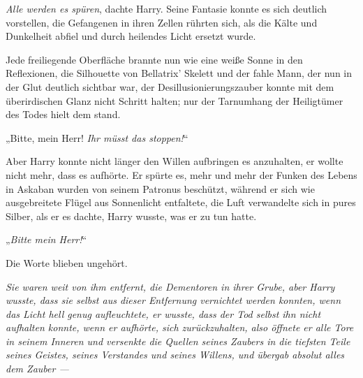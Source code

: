 \emph{Alle werden es spüren}, dachte Harry. Seine Fantasie konnte es sich deutlich vorstellen, die Gefangenen in ihren Zellen rührten sich, als die Kälte und Dunkelheit abfiel und durch heilendes Licht ersetzt wurde.

Jede freiliegende Oberfläche brannte nun wie eine weiße Sonne in den Reflexionen, die Silhouette von Bellatrix’ Skelett und der fahle Mann, der nun in der Glut deutlich sichtbar war, der Desillusionierungszauber konnte mit dem überirdischen Glanz nicht Schritt halten; nur der Tarnumhang der Heiligtümer des Todes hielt dem stand.

„Bitte, mein Herr! \emph{Ihr müsst das stoppen!}“

Aber Harry konnte nicht länger den Willen aufbringen es anzuhalten, er wollte nicht mehr, dass es aufhörte. Er spürte es, mehr und mehr der Funken des Lebens in Askaban wurden von seinem Patronus beschützt, während er sich wie ausgebreitete Flügel aus Sonnenlicht entfaltete, die Luft verwandelte sich in pures Silber, als er es dachte, Harry wusste, was er zu tun hatte.

„\emph{Bitte mein Herr!}“

Die Worte blieben ungehört.

\emph{Sie waren weit von ihm entfernt, die Dementoren in ihrer Grube, aber Harry wusste, dass sie selbst aus dieser Entfernung vernichtet werden konnten, wenn das Licht hell genug aufleuchtete, er wusste, dass der Tod selbst ihn nicht aufhalten konnte, wenn er aufhörte, sich zurückzuhalten, also öffnete er alle Tore in seinem Inneren und versenkte die Quellen seines Zaubers in die tiefsten Teile seines Geistes, seines Verstandes und seines Willens, und übergab absolut alles dem Zauber —}

